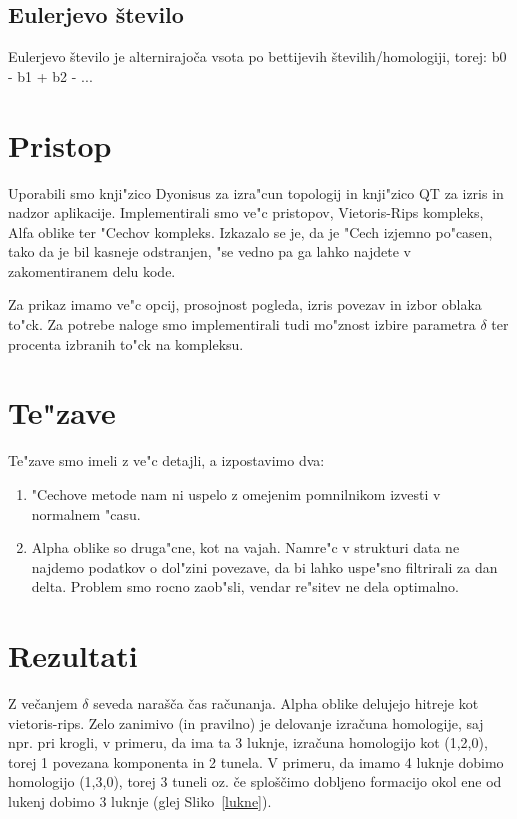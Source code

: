 \documentclass[11pt]{article}
\begin{document}
\subsection{Eulerjevo število}

Eulerjevo število je alternirajoča vsota po bettijevih številih/homologiji, torej: b0 - b1 + b2 - ...

\section{Pristop}

Uporabili smo knji"zico Dyonisus za izra"cun topologij in knji"zico QT za izris in nadzor aplikacije. Implementirali smo ve"c pristopov, Vietoris-Rips kompleks, Alfa oblike ter "Cechov kompleks. Izkazalo se je, da je "Cech izjemno po"casen, tako da je bil kasneje odstranjen, "se vedno pa ga lahko najdete v zakomentiranem delu kode.

Za prikaz imamo ve"c opcij, prosojnost pogleda, izris povezav in izbor oblaka to"ck. Za potrebe naloge smo implementirali tudi mo"znost izbire parametra $\delta$ ter procenta izbranih to"ck na kompleksu.

\section{Te"zave}

Te"zave smo imeli z ve"c detajli, a izpostavimo dva:

\begin{enumerate}
\item "Cechove metode nam ni uspelo z omejenim pomnilnikom izvesti v normalnem "casu.
\item Alpha oblike so druga"cne, kot na vajah. Namre"c v strukturi data ne najdemo podatkov o dol"zini povezave, da bi lahko uspe"sno filtrirali za dan delta. Problem smo rocno zaob"sli, vendar re"sitev ne dela optimalno.
\end{enumerate}

\section{Rezultati}

Z večanjem $\delta$ seveda narašča čas računanja. Alpha oblike delujejo hitreje kot vietoris-rips. Zelo zanimivo (in pravilno) je delovanje izračuna homologije, saj npr. pri krogli, v primeru, da ima ta 3 luknje, izračuna homologijo kot (1,2,0), torej 1 povezana komponenta in 2 tunela. V primeru, da imamo 4 luknje dobimo homologijo (1,3,0), torej 3 tuneli oz. če sploščimo dobljeno formacijo okol ene od lukenj dobimo 3 luknje (glej Sliko~\ref{lukne}).
\end{document}
